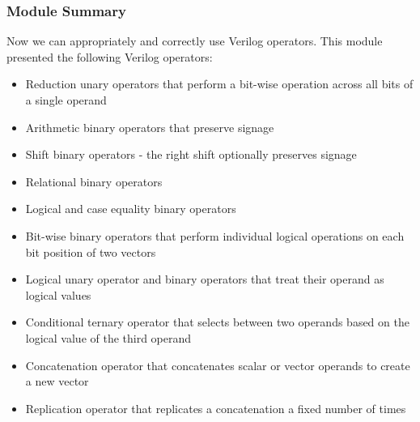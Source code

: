 \documentclass[t, notes, xcolor=table]{beamer}
\begin{document}
\begin{frame}
\frametitle{Module Summary}
\scriptsize{
Now we can appropriately and correctly use Verilog operators. This module presented the following Verilog operators:
\begin{itemize}
\item Reduction unary operators that perform a bit-wise operation across all bits of a single operand
\item Arithmetic binary operators that preserve signage
\item Shift binary operators - the right shift optionally preserves signage
\item Relational binary operators
\item Logical and case equality binary operators
\item Bit-wise binary operators that perform individual logical operations on each bit position of two vectors
\item Logical unary operator and binary operators that treat their operand as logical values
\item Conditional ternary operator that selects between two operands based on the logical value of the third operand
\item Concatenation operator that concatenates scalar or vector operands to create a new vector
\item Replication operator that replicates a concatenation a fixed number of times
\end{itemize}

}
\end{frame}
\end{document}
